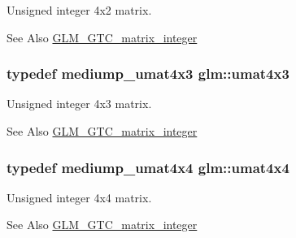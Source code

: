 Unsigned integer 4x2 matrix. 

\begin{DoxySeeAlso}{See Also}
\hyperlink{group__gtc__matrix__integer}{G\-L\-M\-\_\-\-G\-T\-C\-\_\-matrix\-\_\-integer} 
\end{DoxySeeAlso}
\hypertarget{group__gtc__matrix__integer_ga08373f5588a54da1a48e5e55c7d51004}{
\subsubsection[{umat4x3}]{\setlength{\rightskip}{0pt plus 5cm}typedef mediump\-\_\-umat4x3 {\bf glm\-::umat4x3}}}\label{group__gtc__matrix__integer_ga08373f5588a54da1a48e5e55c7d51004}


Unsigned integer 4x3 matrix. 

\begin{DoxySeeAlso}{See Also}
\hyperlink{group__gtc__matrix__integer}{G\-L\-M\-\_\-\-G\-T\-C\-\_\-matrix\-\_\-integer} 
\end{DoxySeeAlso}
\hypertarget{group__gtc__matrix__integer_gae0931b79e808fb0983848778a60eb548}{
\subsubsection[{umat4x4}]{\setlength{\rightskip}{0pt plus 5cm}typedef mediump\-\_\-umat4x4 {\bf glm\-::umat4x4}}}\label{group__gtc__matrix__integer_gae0931b79e808fb0983848778a60eb548}


Unsigned integer 4x4 matrix. 

\begin{DoxySeeAlso}{See Also}
\hyperlink{group__gtc__matrix__integer}{G\-L\-M\-\_\-\-G\-T\-C\-\_\-matrix\-\_\-integer} 
\end{DoxySeeAlso}

